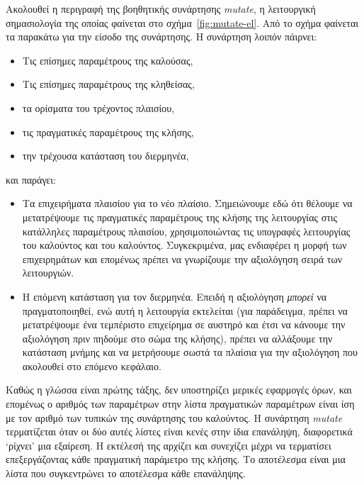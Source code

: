 \documentclass[diploma]{softlab-thesis}
\begin{document}
Ακολουθεί η περιγραφή της βοηθητικής συνάρτησης \textit{mutate}, η λειτουργική σημασιολογία 
της οποίας φαίνεται στο σχήμα~\ref{fig:mutate-el}.
Από το σχήμα φαίνεται τα παρακάτω για την είσοδο της συνάρτησης. Η συνάρτηση λοιπόν πάιρνει:
\begin{itemize}
  \item Τις επίσημες παραμέτρους της καλούσας,
  \item Τις επίσημες παραμέτρους της κληθείσας,
  \item τα ορίσματα του τρέχοντος πλαισίου,
  \item τις πραγματικές παραμέτρους της κλήσης,
  \item την τρέχουσα κατάσταση του διερμηνέα,
\end{itemize}
και παράγει:
\begin{itemize}
\item Τα επιχειρήματα πλαισίου για το νέο πλαίσιο. Σημειώνουμε εδώ ότι θέλουμε να μετατρέψουμε τις πραγματικές 
παραμέτρους της κλήσης της λειτουργίας στις κατάλληλες παραμέτρους πλαισίου, χρησιμοποιώντας τις υπογραφές λειτουργίας 
του καλούντος και του καλούντος. Συγκεκριμένα, μας ενδιαφέρει η μορφή των επιχειρημάτων και επομένως πρέπει να 
γνωρίζουμε την αξιολόγηση σειρά των λειτουργιών.
\item Η επόμενη κατάσταση για τον διερμηνέα. Επειδή η αξιολόγηση \textit{μπορεί} να πραγματοποιηθεί, 
ενώ αυτή η λειτουργία εκτελείται
(για παράδειγμα, πρέπει να μετατρέψουμε ένα τεμπέριστο επιχείρημα σε αυστηρό και έτσι να κάνουμε την αξιολόγηση πριν
πηδούμε στο σώμα της κλήσης), πρέπει να αλλάξουμε την κατάσταση μνήμης και να μετρήσουμε σωστά τα πλαίσια
για την αξιολόγηση που ακολουθεί στο επόμενο κεφάλαιο.
\end{itemize}

Καθώς η γλώσσα είναι πρώτης τάξης, δεν υποστηρίζει μερικές εφαρμογές όρων, και επομένως ο αριθμός των παραμέτρων
στην λίστα πραγματικών παραμέτρων είναι ίση με τον αριθμό των τυπικών της συνάρτησης του καλούντος. Η συνάρτηση 
\textit{mutate} τερματίζεται όταν οι δύο αυτές λίστες είναι κενές στην ίδια επανάληψη, διαφορετικά `ρίχνει' μια 
εξαίρεση. Η εκτέλεσή της αρχίζει και συνεχίζει μέχρι να τερματίσει επεξεργάζοντας κάθε πραγματική παράμετρο της κλήσης. 
Το αποτέλεσμα είναι μια λίστα που συγκεντρώνει το αποτέλεσμα κάθε επανάληψης. 
\end{document}

